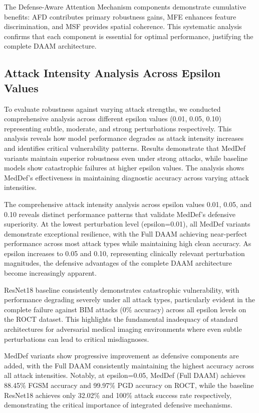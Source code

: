 \documentclass[preprint,12pt]{elsarticle}
\begin{document}
The Defense-Aware Attention Mechanism components demonstrate cumulative benefits: AFD contributes primary robustness gains, MFE enhances feature discrimination, and MSF provides spatial coherence. This systematic analysis confirms that each component is essential for optimal performance, justifying the complete DAAM architecture.

\subsection{Attack Intensity Analysis Across Epsilon Values}
To evaluate robustness against varying attack strengths, we conducted comprehensive analysis across different epsilon values (0.01, 0.05, 0.10) representing subtle, moderate, and strong perturbations respectively. This analysis reveals how model performance degrades as attack intensity increases and identifies critical vulnerability patterns. Results demonstrate that MedDef variants maintain superior robustness even under strong attacks, while baseline models show catastrophic failures at higher epsilon values. The analysis shows MedDef's effectiveness in maintaining diagnostic accuracy across varying attack intensities.

The comprehensive attack intensity analysis across epsilon values 0.01, 0.05, and 0.10 reveals distinct performance patterns that validate MedDef's defensive superiority. At the lowest perturbation level (epsilon=0.01), all MedDef variants demonstrate exceptional resilience, with the Full DAAM achieving near-perfect performance across most attack types while maintaining high clean accuracy. As epsilon increases to 0.05 and 0.10, representing clinically relevant perturbation magnitudes, the defensive advantages of the complete DAAM architecture become increasingly apparent.

ResNet18 baseline consistently demonstrates catastrophic vulnerability, with performance degrading severely under all attack types, particularly evident in the complete failure against BIM attacks (0\% accuracy) across all epsilon levels on the ROCT dataset. This highlights the fundamental inadequacy of standard architectures for adversarial medical imaging environments where even subtle perturbations can lead to critical misdiagnoses.

MedDef variants show progressive improvement as defensive components are added, with the Full DAAM consistently maintaining the highest accuracy across all attack intensities. Notably, at epsilon=0.05, MedDef (Full DAAM) achieves 88.45\% FGSM accuracy and 99.97\% PGD accuracy on ROCT, while the baseline ResNet18 achieves only 32.02\% and 100\% attack success rate respectively, demonstrating the critical importance of integrated defensive mechanisms.
\end{document}
